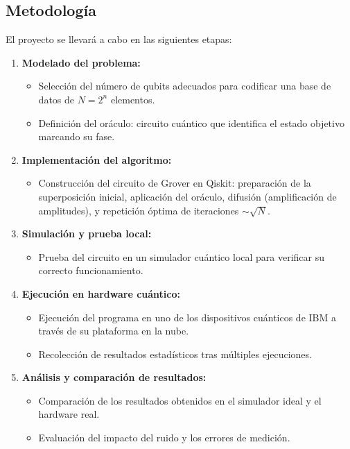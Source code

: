 \documentclass{article}
\begin{document}
\subsection{Metodología}

El proyecto se llevará a cabo en las siguientes etapas:

\begin{enumerate}
    \item \textbf{Modelado del problema:}
    \begin{itemize}
        \item Selección del número de qubits adecuados para codificar una base de datos de $N = 2^n$ elementos.
        \item Definición del oráculo: circuito cuántico que identifica el estado objetivo marcando su fase.
    \end{itemize}
    
    \item \textbf{Implementación del algoritmo:}
    \begin{itemize}
        \item Construcción del circuito de Grover en Qiskit: preparación de la superposición inicial, aplicación del oráculo, difusión (amplificación de amplitudes), y repetición óptima de iteraciones $\sim \sqrt{N}$.
    \end{itemize}
    
    \item \textbf{Simulación y prueba local:}
    \begin{itemize}
        \item Prueba del circuito en un simulador cuántico local para verificar su correcto funcionamiento.
    \end{itemize}
    
    \item \textbf{Ejecución en hardware cuántico:}
    \begin{itemize}
        \item Ejecución del programa en uno de los dispositivos cuánticos de IBM a través de su plataforma en la nube.
        \item Recolección de resultados estadísticos tras múltiples ejecuciones.
    \end{itemize}
    
    \item \textbf{Análisis y comparación de resultados:}
    \begin{itemize}
        \item Comparación de los resultados obtenidos en el simulador ideal y el hardware real.
        \item Evaluación del impacto del ruido y los errores de medición.
    \end{itemize}
\end{enumerate}
\end{document}
